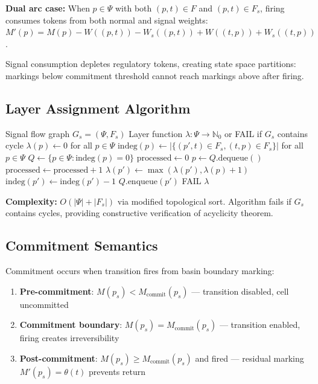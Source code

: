 \documentclass[10pt,letterpaper]{article}
\begin{document}
\textbf{Dual arc case:} When $p \in \Psi$ with both $(p,t) \in F$ and $(p,t) \in F_s$, firing consumes tokens from both normal and signal weights: $M'(p) = M(p) - W((p,t)) - W_s((p,t)) + W((t,p)) + W_s((t,p))$.

Signal consumption depletes regulatory tokens, creating state space partitions: markings below commitment threshold cannot reach markings above after firing.

\subsection{Layer Assignment Algorithm}

\begin{algorithm}
\caption{Hierarchical Layer Assignment}
\begin{algorithmic}[1]
\Require Signal flow graph $G_s = (\Psi, F_s)$
\Ensure Layer function $\lambda: \Psi \rightarrow \mathbb{N}_0$ or FAIL if $G_s$ contains cycle
\State $\lambda(p) \leftarrow 0$ for all $p \in \Psi$
\State $\text{indeg}(p) \leftarrow |\{(p',t) \in F_s, (t,p) \in F_s\}|$ for all $p \in \Psi$ 
\State $Q \leftarrow \{p \in \Psi : \text{indeg}(p) = 0\}$ 
\State $\text{processed} \leftarrow 0$
    \State $p \leftarrow Q.\text{dequeue}()$
    \State $\text{processed} \leftarrow \text{processed} + 1$
     
        \State $\lambda(p') \leftarrow \max(\lambda(p'), \lambda(p) + 1)$
        \State $\text{indeg}(p') \leftarrow \text{indeg}(p') - 1$
            \State $Q.\text{enqueue}(p')$
        \EndIf
    \EndFor
\EndWhile
{}
    \State \Return FAIL 
\Else
    \State \Return $\lambda$
\EndIf
\end{algorithmic}
\end{algorithm}

\textbf{Complexity:} $O(|\Psi| + |F_s|)$ via modified topological sort. Algorithm fails if $G_s$ contains cycles, providing constructive verification of acyclicity theorem.

\subsection{Commitment Semantics}
\label{sec:commitment_semantics}

Commitment occurs when transition fires from basin boundary marking:
\begin{enumerate}
\item \textbf{Pre-commitment}: $M(p_s) < M_{\text{commit}}(p_s)$ --- transition disabled, cell uncommitted
\item \textbf{Commitment boundary}: $M(p_s) = M_{\text{commit}}(p_s)$ --- transition enabled, firing creates irreversibility
\item \textbf{Post-commitment}: $M(p_s) \geq M_{\text{commit}}(p_s)$ and fired --- residual marking $M'(p_s) = \theta(t)$ prevents return
\end{enumerate}
\end{document}
